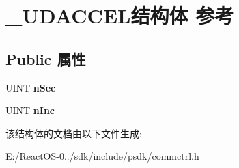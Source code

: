 \hypertarget{struct___u_d_a_c_c_e_l}{}\section{\+\_\+\+U\+D\+A\+C\+C\+E\+L结构体 参考}
\label{struct___u_d_a_c_c_e_l}
\subsection*{Public 属性}
\begin{DoxyCompactItemize}
\item 
\mbox{\label{struct___u_d_a_c_c_e_l_ad98e38915df80f6bac2cf0b394ea39f5}} 
U\+I\+NT {\bfseries n\+Sec}
\item 
\mbox{\label{struct___u_d_a_c_c_e_l_aabad63a9fcca0cb4a71dee427b29c368}} 
U\+I\+NT {\bfseries n\+Inc}
\end{DoxyCompactItemize}


该结构体的文档由以下文件生成\+:\begin{DoxyCompactItemize}
\item 
E\+:/\+React\+O\+S-\/0../sdk/include/psdk/commctrl.\+h\end{DoxyCompactItemize}
